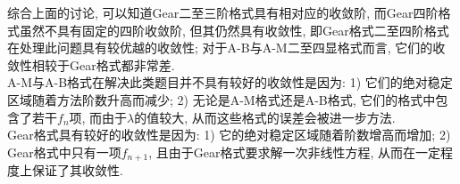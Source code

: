\documentclass[12pt]{article}
\begin{document}
\noindent 综合上面的讨论, 可以知道Gear二至三阶格式具有相对应的收敛阶, 而Gear四阶格式虽然不具有固定的四阶收敛阶, 但其仍然具有收敛性, 即Gear格式二至四阶格式在处理此问题具有较优越的收敛性; 对于A-B与A-M二至四显格式而言, 它们的收敛性相较于Gear格式都非常差.\\
A-M与A-B格式在解决此类题目并不具有较好的收敛性是因为: 1) 它们的绝对稳定区域随着方法阶数升高而减少; 2) 无论是A-M格式还是A-B格式, 它们的格式中包含了若干$f_n$项, 而由于$\lambda$的值较大, 从而这些格式的误差会被进一步方法.\\
Gear格式具有较好的收敛性是因为: 1) 它的绝对稳定区域随着阶数增高而增加; 2) Gear格式中只有一项$f_{n+1}$, 且由于Gear格式要求解一次非线性方程, 从而在一定程度上保证了其收敛性.
\end{document}
